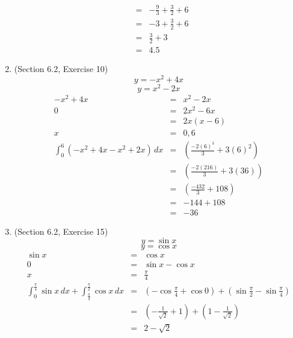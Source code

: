\documentclass{article}
\begin{document}
\begin{enumerate}
\begin{eqnarray}
                                                        &=& -\frac{9}{3} + \frac{3}{2} + 6 \\
                                                        &=& -3 + \frac{3}{2} + 6 \\
                                                        &=& \frac{3}{2} + 3 \\
                                                        &=& 4.5
        \end{eqnarray}
    \item (Section 6.2, Exercise 10)
        $$y = -x^2 + 4x$$
        $$y = x^2 - 2x$$
        \begin{eqnarray}
            -x^2 + 4x &=& x^2 - 2x \\
            0 &=& 2x^2 - 6x \\
              &=& 2x\left(x - 6\right) \\
            x &=& 0, 6 \\
            \int_0^6{\left(-x^2 + 4x - x^2 + 2x\right)\,dx} &=& \left(\frac{-2(6)^3}{3} + 3(6)^2\right) \\
                                                            &=& \left(\frac{-2(216)}{3} + 3(36)\right) \\
                                                            &=& \left(\frac{-432}{3} + 108\right) \\
                                                            &=& -144 + 108 \\
                                                            &=& -36
        \end{eqnarray}
    \item (Section 6.2, Exercise 15)
        $$y = \sin{x}$$
        $$y = \cos{x}$$
        \begin{eqnarray}
            \sin{x} &=& \cos{x} \\
            0 &=& \sin{x} - \cos{x} \\
            x &=& \frac{\pi}{4} \\
            \int_0^{\frac{\pi}{4}}{\sin{x}\,dx} + \int_{\frac{\pi}{4}}^{\frac{\pi}{2}}{\cos{x}\,dx} &=& \left(-\cos{\frac{\pi}{4}} + \cos{0}\right) + \left(\sin{\frac{\pi}{2}} - \sin{\frac{\pi}{4}}\right) \\
                                                                                                    &=& \left(-\frac{1}{\sqrt{2}} + 1\right) + \left(1 - \frac{1}{\sqrt{2}}\right) \\
                                                                                                    &=& 2 - \sqrt{2}

\end{eqnarray}
\end{enumerate}
\end{document}
